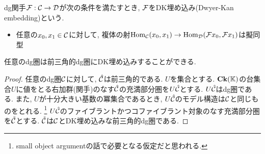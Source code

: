 \documentclass[uplatex, a4paper, 14Q, dvipdfmx]{jsarticle}
\begin{document}
\begin{definition}[DK埋め込み]
  dg関手$\mathcal{F} : \mathcal{C} \to \mathcal{D}$が次の条件を満たすとき, $\mathcal{F}$をDK埋め込み(Dwyer-Kan embedding)という.
  \begin{itemize}
    \item 任意の$x_0,x_1 \in \mathcal{C}$に対して, 複体の射$\mathrm{Hom}_{\mathcal{C}}(x_0,x_1) \to \mathrm{Hom}_{\mathcal{D}}(\mathcal{F} x_0,\mathcal{F} x_1)$は擬同型
  \end{itemize}
\end{definition}

\begin{theorem}
  任意のdg圏は前三角的dg圏にDK埋め込みすることができる. 
\end{theorem}

\begin{proof}
  任意のdg圏$\mathcal{C}$に対して, $\hat{\mathcal{C}}$は前三角的である.
  $U$を集合とする.
  $\mathbf{Ck}(\mathbb{K})$の台集合$U$に値をとる右加群(関手)のなす$\hat{\mathcal{C}}$の充満部分圏を$U\hat{\mathcal{C}}$とする. 
  $U\hat{\mathcal{C}}$はdg圏である.
  また, $U$が十分大きい基数の冪集合であるとき, $U\hat{\mathcal{C}}$のモデル構造は$\mathcal{C}$と同じものをとれる.
  \footnote{
    small object argumentの話で必要となる仮定だと思われる. 
  }
  $U\hat{\mathcal{C}}$のファイブラントかつコファイブラント対象のなす充満部分圏を$\tilde{\mathcal{C}}$とする. 
  $\tilde{\mathcal{C}}$は$\mathcal{C}$とDK埋め込みな前三角的dg圏である. 
\end{proof}




\end{document}
